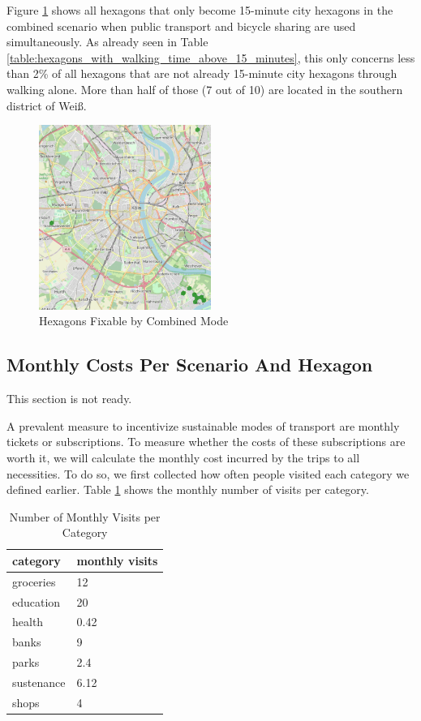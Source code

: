 Figure \ref{fig:combined_hexagons} shows all hexagons that only become 15-minute city hexagons in the combined scenario when public transport and bicycle sharing are used simultaneously.
As already seen in Table \ref{table:hexagons_with_walking_time_above_15_minutes}, this only concerns less than 2\% of all hexagons that are not already 15-minute city hexagons through walking alone.
More than half of those (7 out of 10) are located in the southern district of Weiß.
\begin{figure}
  \begin{center}
    \includegraphics[width=0.50\textwidth]{Figures/results/problematic_hexagons/combined_hexagons}
  \end{center}
  \caption{Hexagons Fixable by Combined Mode}
  \label{fig:combined_hexagons}
\end{figure}


\subsection{Monthly Costs Per Scenario And Hexagon}
This section is not ready.

A prevalent measure to incentivize sustainable modes of transport are monthly tickets or subscriptions.
To measure whether the costs of these subscriptions are worth it, we will calculate the monthly cost incurred by the trips to all necessities.
To do so, we first collected how often people visited each category we defined earlier.
Table \ref{tab:monthly_visits} shows the monthly number of visits per category.

\begin{table}
  \caption{Number of Monthly Visits per Category}
  \label{tab:monthly_visits}
  \begin{center}
    \begin{tabular}[c]{l|l}
      category & monthly visits \\
      \hline
      groceries & 12 \\
      education & 20 \\
      health & 0.42 \\
      banks & 9 \\
      parks & 2.4 \\
      sustenance & 6.12 \\
      shops & 4 \\
      \hline
    \end{tabular}
  \end{center}
\end{table}

